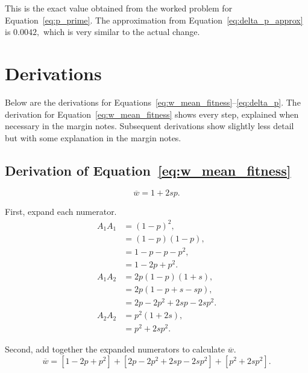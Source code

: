 \documentclass[letterpaper,nofonts]{tufte-handout}
\def\mathnote#1{%
  \tag*{\rlap{\hspace\marginparsep\smash{\parbox[t]{\marginparwidth}{%
  \footnotesize#1}}}}
}
\begin{document}
This is the exact value obtained from the worked problem for Equation~\ref{eq:p_prime}. The approximation from Equation~\ref{eq:delta_p_approx} is $0.0042,$ which is very similar to the actual change.

\newpage

\section*{Derivations}

Below are the derivations for Equations~\ref{eq:w_mean_fitness}–\ref{eq:delta_p}. The derivation for Equation~\ref{eq:w_mean_fitness} shows every step, explained when necessary in the margin notes. Subsequent derivations show slightly less detail but with some explanation in the margin notes. 

\subsection*{Derivation of Equation~\ref{eq:w_mean_fitness}}
%
\label{deriv:w_mean_fitness}

\begin{equation*}
\overline{w} = 1 + 2sp.
\end{equation*}

First, expand each numerator.
\begin{align*}
A_1A_1 &= (1-p)^2, \\
       &= (1-p)(1-p),\\
       &= 1-p-p-p^2, \\
       &= 1-2p+p^2.\\[0.5em]
A_1A_2 &= 2p(1-p)(1+s), \\
       &= 2p(1 - p + s - sp), \\
       &= 2p - 2p^2 + 2sp - 2sp^2.\\[0.5em]
A_2A_2 &= p^2(1 + 2s), \\
       &= p^2 + 2sp^2.
\end{align*}

Second, add together the expanded numerators to calculate $\overline{w}$. 
\begin{equation*}%
\overline{w} = [1-2p+p^2] + [2p - 2p^2 + 2sp - 2sp^2] + [p^2 + 2sp^2].
\end{equation*}
\end{document}
